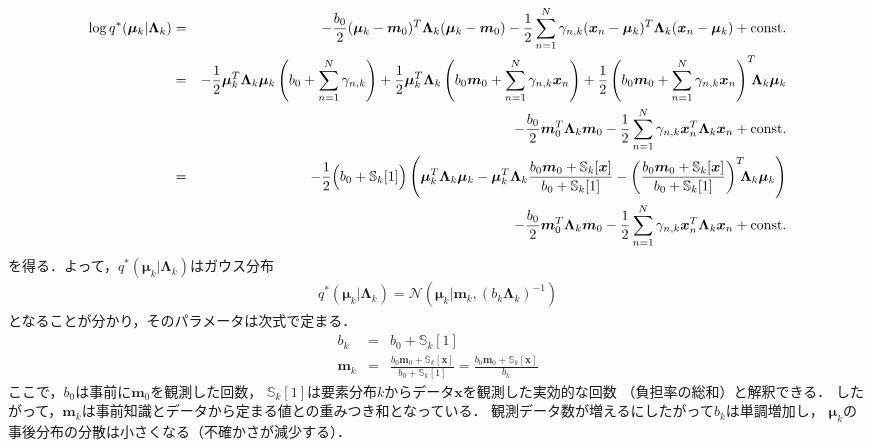 \begin{eqnarray}
\log q^*(\bm\mu_{k}|\bm\Lambda_{k})
&=& 
- \frac{b_0}{2} (\bm\mu_{k} - \bm{m}_0)^T\bm\Lambda_{k}(\bm\mu_{k} - \bm{m}_0)
-\frac{1}{2}
\sum_{n=1}^{N} 
\gamma_{n,k}  
(\bm{x}_n - \bm\mu_{k})^T\bm
\Lambda_{k}(\bm{x}_n - \bm\mu_{k})
+ \mbox{const.}
\nonumber\\
&=&
- \frac{1}{2}
\bm\mu_{k}^T \bm\Lambda_{k} \bm\mu_{k}
\left(b_0 
 + \sum_{n=1}^{N} \gamma_{n,k} 
\right)
+ \frac{1}{2} 
\bm\mu_{k}^T \bm\Lambda_{k} 
\left(
 b_0\bm{m}_0 + 
 \sum_{n=1}^{N} 
 \gamma_{n,k} \bm{x}_n
\right)
+ \frac{1}{2} 
\left(
 b_0\bm{m}_0 + 
 \sum_{n=1}^{N} 
 \gamma_{n,k} \bm{x}_n
\right)^T
\!\!\!\bm\Lambda_{k} \bm\mu_{k}
\nonumber\\
&&
- \frac{b_0}{2} \bm{m}_0^T \bm\Lambda_{k} \bm{m}_0
- \frac{1}{2} 
 \sum_{n=1}^{N} \gamma_{n,k} 
 \bm{x}_n^T \bm\Lambda_{k} \bm{x}_n
+ \mbox{const.}
\nonumber\\
&=&
-\frac{1}{2} \Bigl(b_0 + \mathbb{S}_{k}[1]\Bigr)
\left(\bm\mu_{k}^T \bm\Lambda_{k} \bm\mu_{k}
 - \bm\mu_{k}^T \bm\Lambda_{k} 
\frac{b_0\bm{m}_0 + \mathbb{S}_{k}[\bm{x}]} 
     {b_0 + \mathbb{S}_{k}[1]}
 - 
\left(
\frac{b_0\bm{m}_0 + \mathbb{S}_{k}[\bm{x}]} 
     {b_0 + \mathbb{S}_{k}[1]}\right)^T
     \!\!\!\bm\Lambda_{k} \bm\mu_{k} 
\right)
\nonumber\\
&&
- \frac{b_0}{2} \bm{m}_0^T \bm\Lambda_{k} \bm{m}_0
- \frac{1}{2} 
 \sum_{n=1}^{N} \gamma_{n,k} 
 \bm{x}_n^T \bm\Lambda_{k} \bm{x}_n
+ \mbox{const.}
\end{eqnarray}
を得る．よって，$q^*(\bm\mu_{k}|\bm\Lambda_{k})$はガウス分布
\begin{eqnarray}
q^*(\bm\mu_{k}|\bm\Lambda_{k}) = 
\mathcal{N}\left(\bm\mu_{k}\big|\bm{m}_{k},\left(b_{k}\bm\Lambda_{k}\right)^{-1}\right)
\label{eq:qmklk}
\end{eqnarray}
となることが分かり，そのパラメータは次式で定まる．
\begin{eqnarray}
b_{k} 
&=& b_0 + \mathbb{S}_{k}[1]
\label{eq:bk}\\
\bm{m}_{k}
&=& \frac{b_0\bm{m}_0 + \mathbb{S}_{k}[\bm{x}]} 
       {b_0 + \mathbb{S}_{k}[1]}
= \frac{b_0\bm{m}_0 + \mathbb{S}_{k}[\bm{x}]} 
       {b_{k}}
\label{eq:mk}
\end{eqnarray}
ここで，$b_0$は事前に$\bm{m}_0$を観測した回数，
$\mathbb{S}_{k}[1]$は要素分布$k$からデータ$\bm{x}$を観測した実効的な回数
（負担率の総和）と解釈できる．
したがって，$\bm{m}_{k}$は事前知識とデータから定まる値との重みつき和となっている．
観測データ数が増えるにしたがって$b_k$は単調増加し，
$\bm{\mu}_k$の事後分布の分散は小さくなる（不確かさが減少する）．

